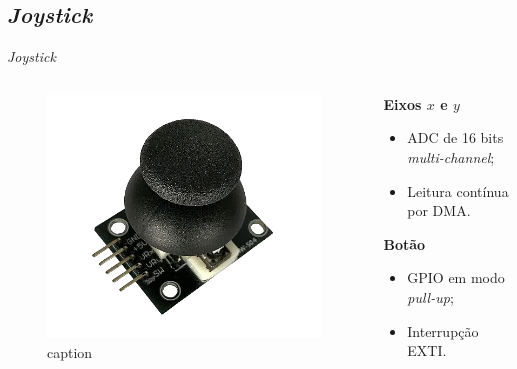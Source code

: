 \documentclass{if-beamer}
\begin{document}
\subsection*{\textit{Joystick}}

\begin{frame}{\textit{Joystick}}
	
	\begin{columns}
		
		\begin{column}{0.5\textwidth}
			
			\begin{figure}[H]
				\centering
				\includegraphics[width=0.75\linewidth]{joystick}
				\caption{caption}
				\label{fig:label}
			\end{figure}
			
		\end{column}
		
		\begin{column}{0.5\textwidth}
			
			\begin{block}{}
				
				\textbf{Eixos $x$ e $y$}
				\begin{itemize}
					\item ADC de 16 bits \textit{multi-channel};
					\item Leitura contínua por DMA.					
				\end{itemize}
			
				\textbf{Botão}
				\begin{itemize}
					\item GPIO em modo \textit{pull-up};
					\item Interrupção EXTI.
					
				\end{itemize}
			
				
			\end{block}
			
		\end{column}
		
	\end{columns}
	
\end{frame}
\end{document}
